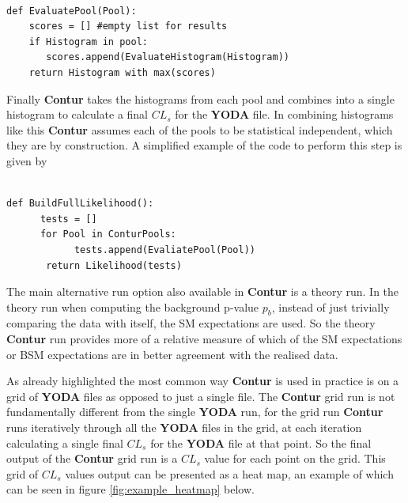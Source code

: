 \begin{code}
\label{code:pools}
\begin{verbatim}

def EvaluatePool(Pool):
    scores = [] #empty list for results
    if Histogram in pool:
       scores.append(EvaluateHistogram(Histogram))
    return Histogram with max(scores)
\end{verbatim}
\end{code}

Finally \textbf{Contur} takes the histograms from each pool and combines into a single histogram to calculate a final $CL_s$ for the \textbf{YODA} file. In combining histograms like this \textbf{Contur} assumes each of the pools to be statistical independent, which they are by construction. A simplified example of the code to perform this step is given by

\begin{code}
\label{code:full_likelihood}
\begin{verbatim}

def BuildFullLikelihood():
      tests = []
      for Pool in ConturPools:
            tests.append(EvaliatePool(Pool))
       return Likelihood(tests)
\end{verbatim}
\end{code}

The main alternative run option also available in \textbf{Contur} is a theory run. In the theory run when computing the background p-value $p_b$, instead of just trivially comparing the data with itself, the SM expectations are used. So the theory \textbf{Contur} run provides more of a relative measure of which of the SM expectations or BSM expectations are in better agreement with the realised data.

As already highlighted the most common way \textbf{Contur} is used in practice is on a grid of \textbf{YODA} files as opposed to just a single file. The \textbf{Contur} grid run is not fundamentally different from the single \textbf{YODA} run, for the grid run \textbf{Contur} runs iteratively through all the \textbf{YODA} files in the grid, at each iteration calculating a single final $CL_{s}$ for the \textbf{YODA} file at that point. So the final output of the \textbf{Contur} grid run is a $CL_{s}$ value for each point on the grid. This grid of $CL_{s}$ values output can be presented as a heat map, an example of which can be seen in figure \ref{fig:example_heatmap} below.


